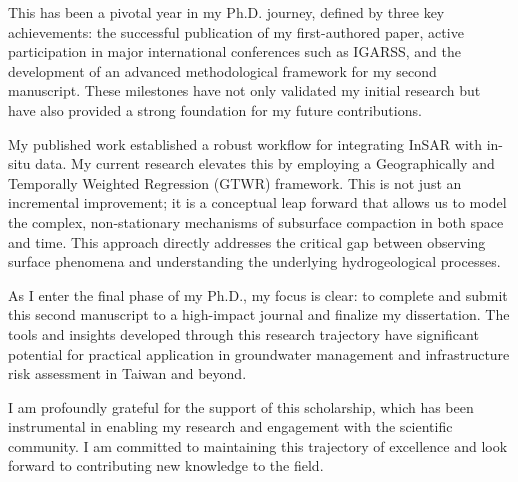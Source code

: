 \documentclass[12pt, a4paper]{article}
\begin{document}
	This has been a pivotal year in my Ph.D. journey, defined by three key achievements: the successful publication of my first-authored paper, active participation in major international conferences such as IGARSS, and the development of an advanced methodological framework for my second manuscript. These milestones have not only validated my initial research but have also provided a strong foundation for my future contributions.
	
	My published work established a robust workflow for integrating InSAR with in-situ data. My current research elevates this by employing a Geographically and Temporally Weighted Regression (GTWR) framework. This is not just an incremental improvement; it is a conceptual leap forward that allows us to model the complex, non-stationary mechanisms of subsurface compaction in both space and time. This approach directly addresses the critical gap between observing surface phenomena and understanding the underlying hydrogeological processes.
	
	As I enter the final phase of my Ph.D., my focus is clear: to complete and submit this second manuscript to a high-impact journal and finalize my dissertation. The tools and insights developed through this research trajectory have significant potential for practical application in groundwater management and infrastructure risk assessment in Taiwan and beyond.
	
	I am profoundly grateful for the support of this scholarship, which has been instrumental in enabling my research and engagement with the scientific community. I am committed to maintaining this trajectory of excellence and look forward to contributing new knowledge to the field.
	
\end{document}
